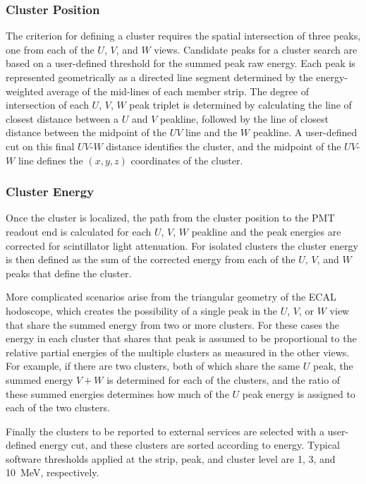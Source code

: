 \subsubsection {Cluster Position}

The criterion for defining a cluster requires the spatial intersection of three peaks, one from each of the $U$,
$V$, and $W$ views. Candidate peaks for a cluster search are based on a user-defined threshold for the
summed peak raw energy. Each peak is represented geometrically as a directed line segment determined by the
energy-weighted average of the mid-lines of each member strip. The degree of intersection of each $U$, $V$,
$W$ peak triplet is determined by calculating the line of closest distance between a $U$ and $V$ peakline,
followed by the line of closest distance between the midpoint of the $UV$ line and the $W$ peakline. A
user-defined cut on this final $UV$-$W$ distance identifies the cluster, and the midpoint of the $UV$-$W$
line defines the $(x,y,z)$ coordinates of the cluster.

\subsubsection {Cluster Energy}

Once the cluster is localized, the path from the cluster position to the PMT readout end is calculated for each $U$,
$V$, $W$ peakline and the peak energies are corrected for scintillator light attenuation.  For isolated clusters
the cluster energy is then defined as the sum of the corrected energy from each of the $U$, $V$, and $W$ peaks
that define the cluster.

More complicated scenarios arise from the triangular geometry of the ECAL hodoscope, which creates the
possibility of a single peak in the $U$, $V$, or $W$ view that share the summed energy from two or more
clusters.  For these cases the energy in each cluster that shares that peak is assumed to be proportional to the
relative partial energies of the multiple clusters as measured in the other views.  For example, if there are two
clusters, both of which share the same $U$ peak, the summed energy $V+W$ is determined for each of the
clusters, and the ratio of these summed energies determines how much of the $U$ peak energy is assigned to
each of the two clusters.

Finally the clusters to be reported to external services are selected with a user-defined energy cut, and these
clusters are sorted according to energy. Typical software thresholds applied at the strip, peak, and cluster level
are 1, 3, and 10~MeV, respectively.

